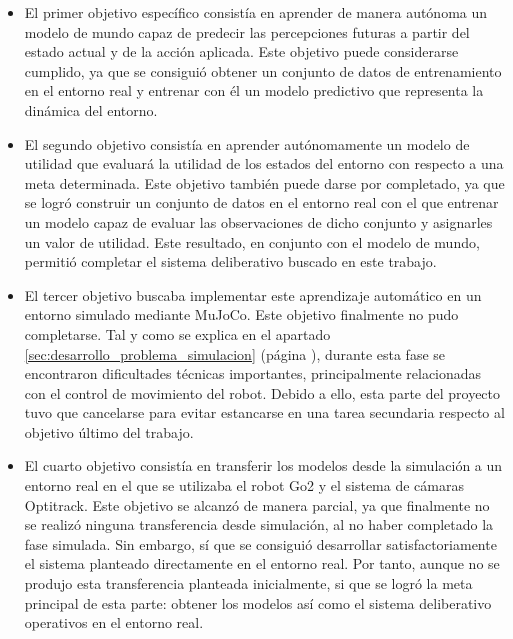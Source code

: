 \begin{itemize}
  
  \item El primer objetivo específico consistía en aprender de manera autónoma un modelo de mundo capaz de predecir las percepciones futuras a partir del estado actual y de la acción 
  aplicada. Este objetivo puede considerarse cumplido, ya que se consiguió obtener un conjunto de datos de entrenamiento en el entorno real y entrenar con él un modelo predictivo que 
  representa la dinámica del entorno.

  \item El segundo objetivo consistía en aprender autónomamente un modelo de utilidad que evaluará la utilidad de los estados del entorno con respecto a una meta determinada. Este objetivo 
  también puede darse por completado, ya que se logró construir un conjunto de datos en el entorno real con el que entrenar un modelo capaz de evaluar las observaciones de dicho conjunto y 
  asignarles un valor de utilidad. Este resultado, en conjunto con el modelo de mundo, permitió completar el sistema deliberativo buscado en este trabajo.

  \item El tercer objetivo buscaba implementar este aprendizaje automático en un entorno simulado mediante MuJoCo. Este objetivo finalmente no pudo completarse. Tal y como se explica en el 
  apartado \ref{sec:desarrollo_problema_simulacion} (página \pageref{sec:desarrollo_problema_simulacion}), durante esta fase se encontraron dificultades técnicas importantes, principalmente 
  relacionadas con el control de movimiento del robot. Debido a ello, esta parte del proyecto tuvo que cancelarse para evitar estancarse en una tarea secundaria respecto al objetivo último 
  del trabajo.

  \item El cuarto objetivo consistía en transferir los modelos desde la simulación a un entorno real en el que se utilizaba el robot Go2 y el sistema de cámaras Optitrack. Este objetivo se 
  alcanzó de manera parcial, ya que finalmente no se realizó ninguna transferencia desde simulación, al no haber completado la fase simulada. Sin embargo, sí que se consiguió desarrollar 
  satisfactoriamente el sistema planteado directamente en el entorno real. Por tanto, aunque no se produjo esta transferencia planteada inicialmente, si que se logró la meta principal de 
  esta parte: obtener los modelos así como el sistema deliberativo operativos en el entorno real.


\end{itemize}
